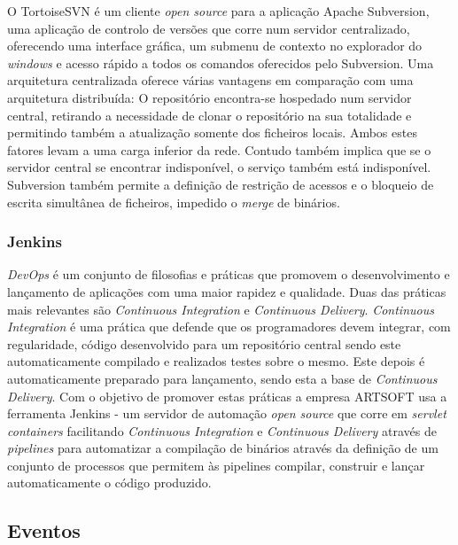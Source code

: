 \documentclass[sigplan]{acmart}
\begin{document}
O TortoiseSVN é um cliente \textit{open source} para a aplicação Apache Subversion, uma aplicação de controlo de versões que corre num servidor centralizado, oferecendo uma interface gráfica, um submenu de contexto no explorador do \textit{windows} e acesso rápido a todos os comandos oferecidos pelo Subversion. Uma arquitetura centralizada oferece várias vantagens em comparação com uma arquitetura distribuída: O repositório encontra-se hospedado num servidor central, retirando a necessidade de clonar o repositório na sua totalidade e permitindo também a atualização somente dos ficheiros locais\cite{subversion}. Ambos estes fatores levam a uma carga inferior da rede. Contudo também implica que se o servidor central se encontrar indisponível, o serviço também está indisponível. Subversion também permite a definição de restrição de acessos e o bloqueio de escrita simultânea de ficheiros, impedido o \textit{merge} de binários.

\subsubsection{Jenkins}

\textit{DevOps} é um conjunto de filosofias e práticas que promovem o desenvolvimento e lançamento de aplicações com uma maior rapidez e qualidade. Duas das práticas mais relevantes são \textit{Continuous Integration} e \textit{Continuous Delivery}. \textit{Continuous Integration} é uma prática que defende que os programadores devem integrar, com regularidade, código desenvolvido para um repositório central sendo este automaticamente compilado e realizados testes sobre o mesmo. Este depois é automaticamente preparado para lançamento, sendo esta a base de \textit{Continuous Delivery}. Com o objetivo de promover estas práticas a empresa ARTSOFT usa a ferramenta Jenkins - um servidor de automação \textit{open source} que corre em \textit{servlet containers} facilitando \textit{Continuous Integration} e \textit{Continuous Delivery} através de \textit{pipelines} para automatizar a compilação de binários através da definição de um conjunto de processos que permitem às pipelines compilar, construir e lançar automaticamente o código produzido.

\subsection{Eventos}
\end{document}
